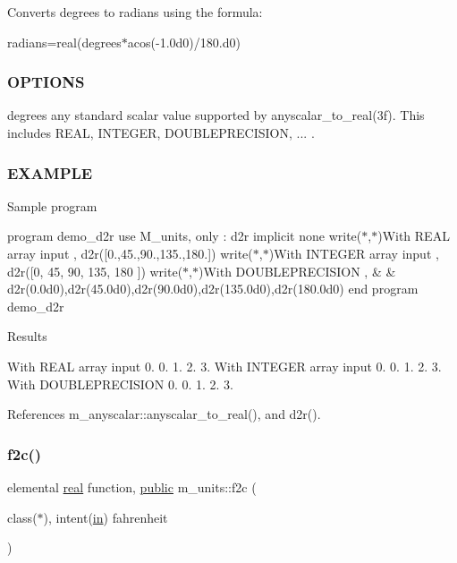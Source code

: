 Converts degrees to radians using the formula\+:

radians=real(degrees$\ast$acos(-\/1.\+0d0)/180.d0) \subsubsection*{O\+P\+T\+I\+O\+NS}

degrees any standard scalar value supported by anyscalar\+\_\+to\+\_\+real(3f). This includes R\+E\+AL, I\+N\+T\+E\+G\+ER, D\+O\+U\+B\+L\+E\+P\+R\+E\+C\+I\+S\+I\+ON, ... . \subsubsection*{E\+X\+A\+M\+P\+LE}

Sample program

program demo\+\_\+d2r use M\+\_\+units, only \+: d2r implicit none write($\ast$,$\ast$)\textquotesingle{}With R\+E\+AL array input \textquotesingle{}, d2r(\mbox{[}0.,45.,90.,135.,180.\mbox{]}) write($\ast$,$\ast$)\textquotesingle{}With I\+N\+T\+E\+G\+ER array input \textquotesingle{}, d2r(\mbox{[}0,  45,  90,  135,  180  \mbox{]}) write($\ast$,$\ast$)\textquotesingle{}With D\+O\+U\+B\+L\+E\+P\+R\+E\+C\+I\+S\+I\+ON \textquotesingle{}, \& \& d2r(0.\+0d0),d2r(45.\+0d0),d2r(90.\+0d0),d2r(135.\+0d0),d2r(180.\+0d0) end program demo\+\_\+d2r

Results

With R\+E\+AL array input 0. 0. 1. 2. 3. With I\+N\+T\+E\+G\+ER array input 0. 0. 1. 2. 3. With D\+O\+U\+B\+L\+E\+P\+R\+E\+C\+I\+S\+I\+ON 0. 0. 1. 2. 3. 

References m\+\_\+anyscalar\+::anyscalar\+\_\+to\+\_\+real(), and d2r().

\mbox{\label{namespacem__units_a8f71442bfefc89e6e4636f3a4677b796}} 
\subsubsection{\texorpdfstring{f2c()}{f2c()}}
{\footnotesize\ttfamily elemental \hyperlink{read__watch_83_8txt_abdb62bde002f38ef75f810d3a905a823}{real} function, \hyperlink{M__stopwatch_83_8txt_a2f74811300c361e53b430611a7d1769f}{public} m\+\_\+units\+::f2c (\begin{DoxyParamCaption}\item[{class($\ast$), intent(\hyperlink{M__journal_83_8txt_afce72651d1eed785a2132bee863b2f38}{in})}]{fahrenheit }\end{DoxyParamCaption})}



